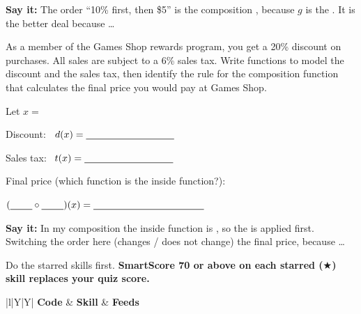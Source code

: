 \textbf{Say it:} The order ``10\% first, then \$5'' is the composition \blank[1.6cm], because $g$ is the \blank[2.4cm]. It is the better deal because \dots\lines[1]

As a member of the Games Shop rewards program, you get a 20\% discount on purchases. All sales are subject to a 6\% sales tax. Write functions to model the discount and the sales tax, then identify the rule for the composition function that calculates the final price you would pay at Games Shop.

\begin{minipage}[t]{0.48\textwidth}
Let $x=$ \blank[4.2cm]

\vspace{6pt}
Discount: \ $d(x)=\blank[3.2cm]$

\vspace{6pt}
Sales tax: \ $t(x)=\blank[3.2cm]$
\end{minipage}\hfill
\begin{minipage}[t]{0.48\textwidth}
\raggedright Final price (which function is the inside function?):

\vspace{6pt}
$(\blank[0.8cm]\circ\blank[0.8cm])(x)=\blank[4cm]$
\lines[2]
\end{minipage}

\textbf{Say it:} In my composition the inside function is \blank[1.2cm], so the \blank[2.2cm] is applied first. Switching the order here \blank[3cm] (changes / does not change) the final price, because \dots\lines[1]

\newpage

Do the starred skills first. \textbf{SmartScore 70 or above on each starred ($\bigstar$) skill replaces your quiz score.}

\vspace{2pt}
\begin{tabularx}{\textwidth}{|l|Y|Y|}
\hline
\textbf{Code} & \textbf{Skill} & \textbf{Feeds} \\ \hline
{}
\hline
\end{tabularx}

